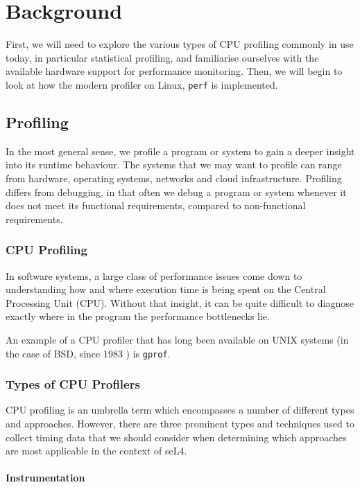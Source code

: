 \chapter{Background}\label{ch:background}

First, we will need to explore the various types of CPU profiling commonly in use today, in particular statistical profiling, and familiarise ourselves with the available hardware support for performance monitoring. Then, we will begin to look at how the modern profiler on Linux, \texttt{perf} is implemented.

\section{Profiling}

In the most general sense, we profile a program or system to gain a deeper insight into its runtime behaviour. The systems that we may want to profile can range from hardware, operating systems, networks and cloud infrastructure. Profiling differs from debugging, in that often we debug a program or system whenever it does not meet its functional requirements, compared to non-functional requirements.

\subsection{CPU Profiling}

In software systems, a large class of performance issues come down to understanding how and where execution time is being spent on the Central Processing Unit (CPU). Without that insight, it can be quite difficult to diagnose exactly where in the program the performance bottlenecks lie.

An example of a CPU profiler that has long been available on UNIX systems (in the case of BSD, since 1983 \cite{ManGprof}) is \texttt{gprof}.

\subsection{Types of CPU Profilers}\label{sect:cpu_profiler_types}

CPU profiling is an umbrella term which encompasses a number of different types and approaches. However, there are three prominent types and techniques used to collect timing data that we should consider when determining which approaches are most applicable in the context of seL4.

\subsubsection{Instrumentation}

